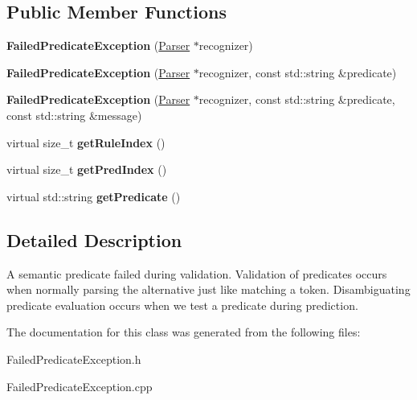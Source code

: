 \subsection*{Public Member Functions}
\begin{DoxyCompactItemize}
\item 
\mbox{\label{classantlr4_1_1FailedPredicateException_a196d1a7558c4ee8b6038024391acd563}} 
{\bfseries Failed\+Predicate\+Exception} (\hyperlink{classantlr4_1_1Parser}{Parser} $\ast$recognizer)
\item 
\mbox{\label{classantlr4_1_1FailedPredicateException_ae4a692ef08008bec04d8e55f878d821b}} 
{\bfseries Failed\+Predicate\+Exception} (\hyperlink{classantlr4_1_1Parser}{Parser} $\ast$recognizer, const std\+::string \&predicate)
\item 
\mbox{\label{classantlr4_1_1FailedPredicateException_afa8818cb3e06ca4a31e34d6d7387f511}} 
{\bfseries Failed\+Predicate\+Exception} (\hyperlink{classantlr4_1_1Parser}{Parser} $\ast$recognizer, const std\+::string \&predicate, const std\+::string \&message)
\item 
\mbox{\label{classantlr4_1_1FailedPredicateException_a82c95a8a34d0b86755d499d85920e73e}} 
virtual size\+\_\+t {\bfseries get\+Rule\+Index} ()
\item 
\mbox{\label{classantlr4_1_1FailedPredicateException_a2c360c375c01b03b4d6eeaa317b0ca17}} 
virtual size\+\_\+t {\bfseries get\+Pred\+Index} ()
\item 
\mbox{\label{classantlr4_1_1FailedPredicateException_afeced5996eec38b0d89774e64d461e3d}} 
virtual std\+::string {\bfseries get\+Predicate} ()
\end{DoxyCompactItemize}


\subsection{Detailed Description}
A semantic predicate failed during validation. Validation of predicates occurs when normally parsing the alternative just like matching a token. Disambiguating predicate evaluation occurs when we test a predicate during prediction. 

The documentation for this class was generated from the following files\+:\begin{DoxyCompactItemize}
\item 
Failed\+Predicate\+Exception.\+h\item 
Failed\+Predicate\+Exception.\+cpp\end{DoxyCompactItemize}
